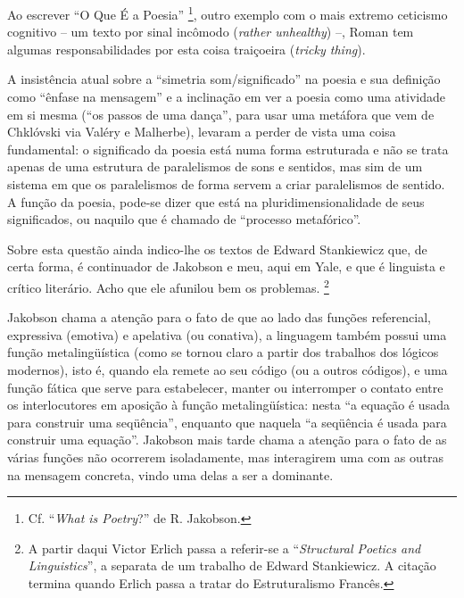 Ao escrever ``O Que É a Poesia'' \footnote{Cf. ``\emph{What is
  Poetry}?'' de R. Jakobson.}, outro exemplo com o mais extremo
ceticismo cognitivo -- um texto por sinal incômodo (\emph{rather
unhealthy}) --, Roman tem algumas responsabilidades por esta coisa
traiçoeira (\emph{tricky thing}).

A insistência atual sobre a ``simetria som/significado'' na poesia e sua
definição como ``ênfase na mensagem'' e a inclinação em ver a poesia
como uma atividade em si mesma (``os passos de uma dança'', para usar
uma metáfora que vem de Chklóvski via Valéry e Malherbe), levaram a
perder de vista uma coisa fundamental: o significado da poesia está numa
forma estruturada e não se trata apenas de uma estrutura de paralelismos
de sons e sentidos, mas sim de um sistema em que os paralelismos de
forma servem a criar paralelismos de sentido. A função da poesia,
pode-se dizer que está na pluridimensionalidade de seus significados, ou
naquilo que é chamado de ``processo metafórico''.

Sobre esta questão ainda indico-lhe os textos de Edward Stankiewicz que,
de certa forma, é continuador de Jakobson e meu, aqui em Yale, e que é
linguista e crítico literário. Acho que ele afunilou bem os problemas.
\footnote{A partir daqui Victor Erlich passa a referir-se a
  ``\emph{Structural Poetics and Linguistics}'', a separata de um
  trabalho de Edward Stankiewicz. A citação termina quando Erlich passa
  a tratar do Estruturalismo Francês.}

Jakobson chama a atenção para o fato de que ao lado das funções
referencial, expressiva (emotiva) e apelativa (ou conativa), a linguagem
também possui uma função metalingüística (como se tornou claro a partir
dos trabalhos dos lógicos modernos), isto é, quando ela remete ao seu
código (ou a outros códigos), e uma função fática que serve para
estabelecer, manter ou interromper o contato entre os interlocutores em
aposição à função metalingüística: nesta ``a equação é usada para
construir uma seqüência'', enquanto que naquela ``a seqüência é usada
para construir uma equação''. Jakobson mais tarde chama a atenção para o
fato de as várias funções não ocorrerem isoladamente, mas interagirem
uma com as outras na mensagem concreta, vindo uma delas a ser a
dominante.

